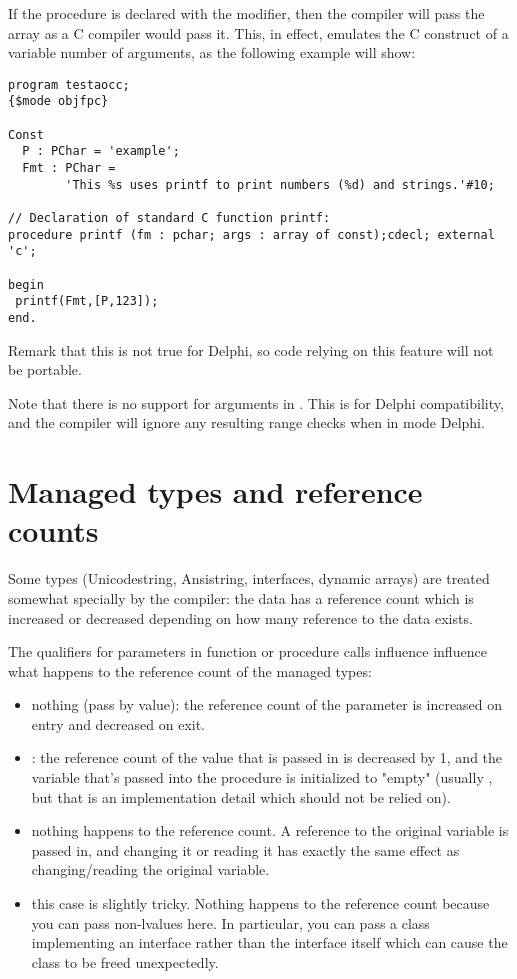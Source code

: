 If the procedure is declared with the  modifier, then the
compiler will pass the array as a C compiler would pass it. This, in effect,
emulates the C construct of a variable number of arguments, as the following
example will show:
\begin{verbatim}
program testaocc;
{$mode objfpc}

Const
  P : PChar = 'example';
  Fmt : PChar =
        'This %s uses printf to print numbers (%d) and strings.'#10;

// Declaration of standard C function printf:
procedure printf (fm : pchar; args : array of const);cdecl; external 'c';

begin
 printf(Fmt,[P,123]);
end.
\end{verbatim}
Remark that this is not true for Delphi, so code relying on this feature
will not be portable.

\begin{remark}
Note that there is no support for  arguments in . 
This is for Delphi compatibility, and the compiler will ignore any resulting range checks
when in mode Delphi.
\end{remark}

\section{Managed types and reference counts}
Some types (Unicodestring, Ansistring, interfaces, dynamic arrays) are
treated somewhat specially by the compiler: the data has a reference count
which is increased or decreased depending on how many reference to the data
exists.

The qualifiers for parameters in function or procedure calls influence
influence what happens to the reference count of the managed types:
\begin{itemize}
\item nothing (pass by value): the reference count of the parameter is increased 
on entry and decreased on exit.
\item {}: the reference count of the value that is passed in is decreased by 1,
 and the variable that's passed into the procedure is initialized to "empty"
(usually , but that is an implementation detail which should not
be relied on).
\item {} nothing happens to the reference count. A reference to the original
 variable is passed in, and changing it or reading it has exactly the same effect as changing/reading the original variable.
\item {} this case is slightly tricky. Nothing happens to the reference
count because you can pass non-lvalues here. 
In particular, you can pass a class implementing an interface rather than the interface itself
which can cause the class to be freed unexpectedly.
\end{itemize}

